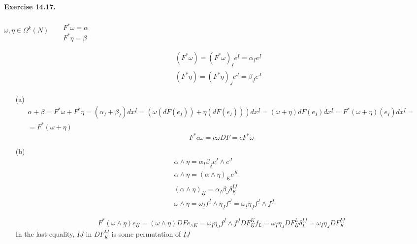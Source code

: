 \documentclass[11pt]{amsart}
\theoremstyle{definition}
\newcommand{\exercisehead}[1]{\medskip\noindent\textbf{Exercise #1.} }
\begin{document}
\exercisehead{14.17}

$\omega, \eta \in \Omega^k(N)$ \quad \quad \, $\begin{aligned} & \quad \\
  & F^* \omega = \alpha \\
  & F^* \eta = \beta \end{aligned}$


\[
\begin{aligned}
  & (F^* \omega)  = (F^* \omega)_{\underline{I}} e^{\underline{I}} = \alpha_{\underline{I}} e^{ \underline{I}} \\
  &  (F^* \eta) = (F^* \eta)_{\underline{J}} e^{ \underline{J}} = \beta_{\underline{J}} e^{\underline{J}}
\end{aligned}
\]
\begin{enumerate}
\item[(a)] \[
\begin{gathered}
  \alpha + \beta  = F^* \omega + F^*\eta = (\alpha_{\underline{I}} + \beta_{\underline{I}} ) dx^{\underline{I}} = (\omega(dF(e_{\underline{I}} ) ) + \eta( dF(e_{\underline{I}})) )dx^{\underline{I}} = (\omega+ \eta) dF(e_I) dx^{\underline{I}} = F^*(\omega + \eta)(e_{\underline{I}})dx^{\underline{I}} = \\
  = F^*(\omega+ \eta)
\end{gathered}
\]
\[
F^*c\omega = c \omega DF = c F^*\omega
\]
\item[(b)] \[
\begin{aligned}
  & \alpha \wedge \eta = \alpha_{\underline{I}} \beta_{\underline{J}} e^{ \underline{I}} \wedge e^{ \underline{J}} \\
  & \alpha \wedge \eta = (\alpha \wedge \eta)_{\underline{K}} e^{ \underline{K}}  \\
  & (\alpha \wedge \eta)_{\underline{K}} = \alpha_{\underline{I}} \beta_{\underline{J}} \delta^{ \underline{I} \underline{J}}_{ \underline{K}}  \\
& \omega \wedge \eta = \omega_{\underline{I}} f^{\underline{I}} \wedge \eta_{\underline{J}} f^{\underline{J}} = \omega_{\underline{I}} \eta_{\underline{J}} f^{\underline{I}} \wedge f^{\underline{J}}
\end{aligned}
\]

\[
F^*(\omega \wedge \eta) e_{\underline{K}} = (\omega \wedge \eta) DF e_{\wedge{K}} = \omega_{\underline{I}} \eta_{\underline{J}} f^{ \underline{I}} \wedge f^{\underline{J}} DF^K_{ \underline{K}} f_L = \omega_{\underline{I}} \eta_{\underline{J}} DF^L_{\underline{K}} \delta^{ \underline{I} \underline{J}}_L = \omega_{\underline{I}} \eta_{\underline{J}} DF^{ \underline{I}\underline{J}}_{\underline{K}}
\]
In the last equality, $\underline{I} \underline{J}$ in $DF^{\underline{I}\underline{J}}_{\underline{K}}$ is some permutation of $\underline{I}\underline{J}$



\end{enumerate}
\end{document}
